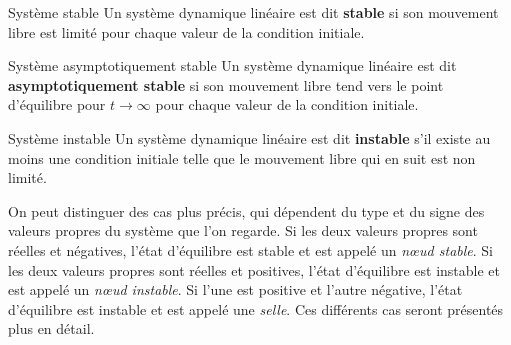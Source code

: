         \begin{definition}{Système stable}
            Un système dynamique linéaire est dit \textbf{stable} si son mouvement libre est limité pour chaque valeur de la condition initiale.
        \end{definition}

        \begin{definition}{Système asymptotiquement stable}
            Un système dynamique linéaire est dit \textbf{asymptotiquement stable} si son mouvement libre tend vers le point d'équilibre pour $t \to \infty$ pour chaque valeur de la condition initiale.
        \end{definition}

        \begin{definition}{Système instable}
            Un système dynamique linéaire est dit \textbf{instable} s'il existe au moins une condition initiale telle que le mouvement libre qui en suit est non limité.
        \end{definition}

        On peut distinguer des cas plus précis, qui dépendent du type et du signe des valeurs propres du système que l'on regarde. 
        Si les deux valeurs propres sont réelles et négatives, l'état d'équilibre est stable et est appelé un \textit{nœud stable}. Si les deux valeurs propres sont réelles et positives, l'état d'équilibre est instable et est appelé un \textit{nœud instable}. Si l'une est positive et l'autre négative, l'état d'équilibre est instable et est appelé une \textit{selle}. Ces différents cas seront présentés plus en détail.

    
